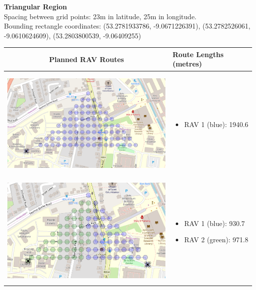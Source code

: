 \textbf{Triangular Region}
\\Spacing between grid points: 23m in latitude, 25m in longitude.
\\Bounding rectangle coordinates: (53.2781933786, -9.0671226391), (53.2782526061, -9.0610624609), (53.2803800539, -9.06409255)
\\
\begin{table}[h!]
  \centering
  \begin{tabular}{ | c | m{5cm} | }
    \hline
    Planned RAV Routes & Route Lengths (metres) \\
    \hline
    
    \begin{minipage}[c][57mm][c]{.6\textwidth}
      \includegraphics[width=\linewidth, height=55mm]{Chapters/MultiAgentCoverage/MultipleTravellingSalesman/Figs/Triangle/OneRAV.PNG}
    \end{minipage}
    &
    \begin{itemize}[leftmargin=*]
      \item[] RAV 1 (blue): 1940.6
    \end{itemize}
    \\
    \hline
    \begin{minipage}[c][57mm][c]{.6\textwidth}
      \includegraphics[width=\linewidth, height=55mm]{Chapters/MultiAgentCoverage/MultipleTravellingSalesman/Figs/Triangle/TwoRAV.PNG}
    \end{minipage}
    &
    \begin{itemize}[leftmargin=*]
        \item[] RAV 1 (blue): 930.7
        \item[] RAV 2 (green): 971.8
    \end{itemize}
    \\
    \hline
    

\end{tabular}
\end{table}
